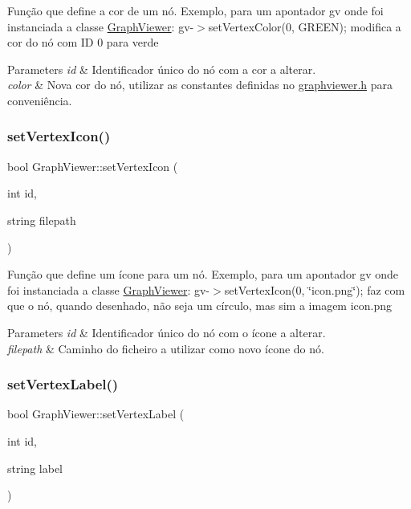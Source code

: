 Função que define a cor de um nó. Exemplo, para um apontador gv onde foi instanciada a classe \mbox{\hyperlink{class_graph_viewer}{Graph\+Viewer}}\+: gv-\/$>$set\+Vertex\+Color(0, G\+R\+E\+E\+N); modifica a cor do nó com ID 0 para verde


\begin{DoxyParams}{Parameters}
{\em id} & Identificador único do nó com a cor a alterar. \\
\hline
{\em color} & Nova cor do nó, utilizar as constantes definidas no \mbox{\hyperlink{graphviewer_8h_source}{graphviewer.\+h}} para conveniência. \\
\hline
\end{DoxyParams}
\mbox{\label{class_graph_viewer_a02d5f7393eab9a2d1b66719039597a64}} 
\subsubsection{\texorpdfstring{set\+Vertex\+Icon()}{setVertexIcon()}}
{\footnotesize\ttfamily bool Graph\+Viewer\+::set\+Vertex\+Icon (\begin{DoxyParamCaption}\item[{int}]{id,  }\item[{string}]{filepath }\end{DoxyParamCaption})}

Função que define um ícone para um nó. Exemplo, para um apontador gv onde foi instanciada a classe \mbox{\hyperlink{class_graph_viewer}{Graph\+Viewer}}\+: gv-\/$>$set\+Vertex\+Icon(0, \char`\"{}icon.\+png\char`\"{}); faz com que o nó, quando desenhado, não seja um círculo, mas sim a imagem icon.\+png


\begin{DoxyParams}{Parameters}
{\em id} & Identificador único do nó com o ícone a alterar. \\
\hline
{\em filepath} & Caminho do ficheiro a utilizar como novo ícone do nó. \\
\hline
\end{DoxyParams}
\mbox{\label{class_graph_viewer_ac25d7d007022fda16799808ba136e909}} 
\subsubsection{\texorpdfstring{set\+Vertex\+Label()}{setVertexLabel()}}
{\footnotesize\ttfamily bool Graph\+Viewer\+::set\+Vertex\+Label (\begin{DoxyParamCaption}\item[{int}]{id,  }\item[{string}]{label }\end{DoxyParamCaption})}

